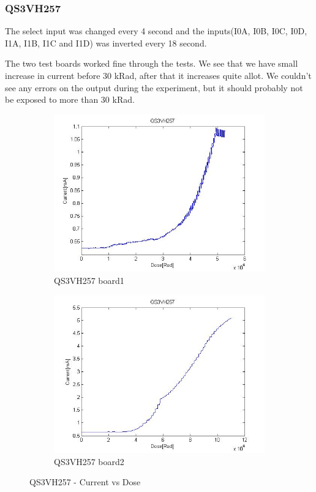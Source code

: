 \documentclass[12pt]{article}
\numberwithin{figure}{section}
\begin{document}
\subsubsection{QS3VH257}
The select input was changed every 4 second and the inputs(I0A, I0B, I0C, I0D, I1A, I1B, I1C and I1D) was inverted every 18 second.

The two test boards worked fine through the tests.
We see that we have small increase in current before 30 kRad, after that it increases quite allot. We couldn't see any errors on the output during the experiment, but it should probably not be exposed to more than 30 kRad.

\begin{figure}[!htbp]
\centering
  \begin{subfigure}{.49\textwidth}
  \centering
  \includegraphics[width=\linewidth]{current_q.jpg}
  \caption{QS3VH257 board1}
  \label{QS3VH257_1}
  \end{subfigure}
  \begin{subfigure}{.49\textwidth}
  \centering
  \includegraphics[width=\linewidth]{current_dose_q2.jpg}
  \caption{QS3VH257 board2}
  \label{QS3VH257_2}
  \end{subfigure}
 \caption{QS3VH257 - Current vs Dose}
\end{figure}
\end{document}
